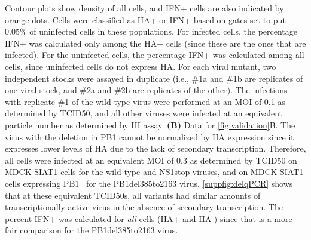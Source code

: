 \documentclass[10pt,letterpaper]{article}
\newcommand{\FIG}[1]{\autoref{fig:#1}}
\newcommand{\SUPPFIG}[1]{\autoref{suppfig:#1}}
\begin{document}
\begin{suppfig}
{Contour plots show density of all cells, and IFN+ cells are also indicated by orange dots.
Cells were classified as HA+ or IFN+ based on gates set to put 0.05\% of uninfected cells in these populations.
For infected cells, the percentage IFN+ was calculated only among the HA+ cells (since these are the ones that are infected).
For the uninfected cells, the percentage IFN+ was calculated among all cells, since uninfected cells do not express HA.
For each viral mutant, two independent stocks were assayed in duplicate (i.e., \#1a and \#1b are replicates of one viral stock, and \#2a and \#2b are replicates of the other).
The infections with replicate \#1 of the wild-type virus were performed at an MOI of 0.1 as determined by TCID50, and all other viruses were infected at an equivalent particle number as determined by HI assay. 
{\bf (B)}
Data for \FIG{validation}B.
The virus with the deletion in PB1 cannot be normalized by HA expression since it expresses lower levels of HA due to the lack of secondary transcription.
Therefore, all cells were infected at an equivalent MOI of 0.3 as determined by TCID50 on MDCK-SIAT1 cells for the wild-type and NS1stop viruses, and on MDCK-SIAT1 cells expressing PB1~\cite{bloom2010permissive} for the PB1del385to2163 virus.
\SUPPFIG{delqPCR} shows that at these equivalent TCID50s, all variants had similar amounts of transcriptionally active virus in the absence of secondary transcription.
The percent IFN+ was calculated for \emph{all} cells (HA+ and HA-) since that is a more fair comparison for the PB1del385to2163 virus.
}
\label{suppfig:validationflow}
\end{suppfig}
\end{document}
